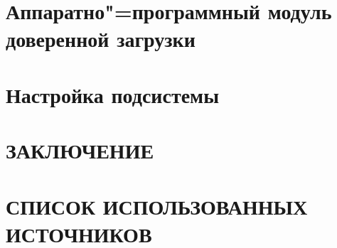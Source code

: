 \documentclass[spec, och, pract, times]{shiza}
\begin{document}

\tableofcontents

\intro


\section{Аппаратно"=программный модуль доверенной загрузки}


\section{Настройка подсистемы}




\section*{ЗАКЛЮЧЕНИЕ}


\section*{СПИСОК ИСПОЛЬЗОВАННЫХ ИСТОЧНИКОВ}
% 
% 
\end{document}
